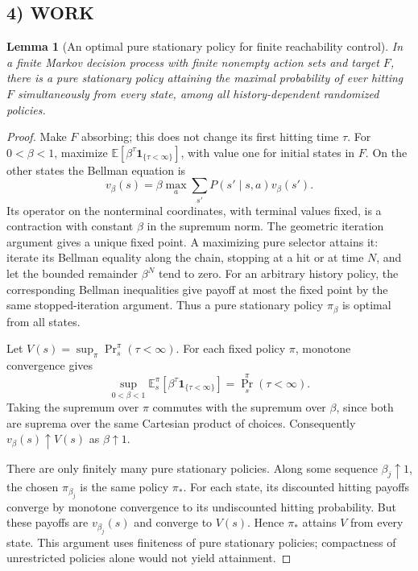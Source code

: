 \documentclass[11pt,a4paper]{article}
\newtheorem{lemma}[theorem]{Lemma}
\theoremstyle{definition}
\theoremstyle{remark}
\begin{document}
\subsection*{4) WORK}
\begin{lemma}[An optimal pure stationary policy for finite reachability control]
In a finite Markov decision process with finite nonempty action sets and target $F$, there is a pure stationary policy attaining the maximal probability of ever hitting $F$ simultaneously from every state, among all history-dependent randomized policies.
\end{lemma}
\begin{proof}
Make $F$ absorbing; this does not change its first hitting time $\tau$. For $0<\beta<1$, maximize $\mathbb E[\beta^\tau\mathbf1_{\{\tau<\infty\}}]$, with value one for initial states in $F$. On the other states the Bellman equation is
\[
 v_\beta(s)=\beta\max_a\sum_{s'}P(s'\mid s,a)v_\beta(s').
\]
Its operator on the nonterminal coordinates, with terminal values fixed, is a contraction with constant $\beta$ in the supremum norm. The geometric iteration argument gives a unique fixed point. A maximizing pure selector attains it: iterate its Bellman equality along the chain, stopping at a hit or at time $N$, and let the bounded remainder $\beta^N$ tend to zero. For an arbitrary history policy, the corresponding Bellman inequalities give payoff at most the fixed point by the same stopped-iteration argument. Thus a pure stationary policy $\pi_\beta$ is optimal from all states.

Let $V(s)=\sup_\pi\Pr_s^\pi(\tau<\infty)$. For each fixed policy $\pi$, monotone convergence gives
\[
 \sup_{0<\beta<1}\mathbb E_s^\pi[\beta^\tau\mathbf1_{\{\tau<\infty\}}]
 =\Pr_s^\pi(\tau<\infty).
\]
Taking the supremum over $\pi$ commutes with the supremum over $\beta$, since both are suprema over the same Cartesian product of choices. Consequently $v_\beta(s)\uparrow V(s)$ as $\beta\uparrow1$.

There are only finitely many pure stationary policies. Along some sequence $\beta_j\uparrow1$, the chosen $\pi_{\beta_j}$ is the same policy $\pi_*$. For each state, its discounted hitting payoffs converge by monotone convergence to its undiscounted hitting probability. But these payoffs are $v_{\beta_j}(s)$ and converge to $V(s)$. Hence $\pi_*$ attains $V$ from every state. This argument uses finiteness of pure stationary policies; compactness of unrestricted policies alone would not yield attainment.
\end{proof}
\end{document}
